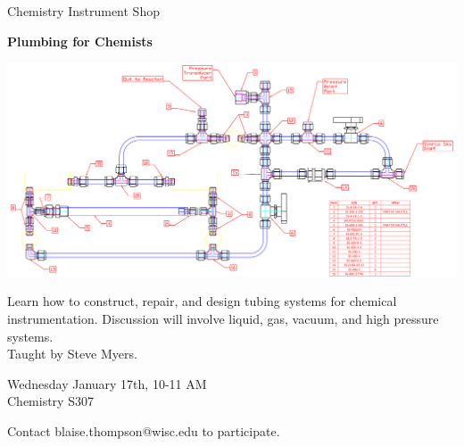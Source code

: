\documentclass{article}
\begin{document}
\center

\Huge

Chemistry Instrument Shop

\textbf{
Plumbing for Chemists
}

\includegraphics[width=\linewidth]{coverart.png}

{
\huge
Learn how to construct, repair, and design tubing systems for chemical instrumentation.
Discussion will involve liquid, gas, vacuum, and high pressure systems. \\
Taught by Steve Myers.
}

\vfill

{
\huge
Wednesday January 17th, 10-11 AM\\
Chemistry S307
}

\vfill

{
\huge
Contact blaise.thompson@wisc.edu to participate.
}
\end{document}

